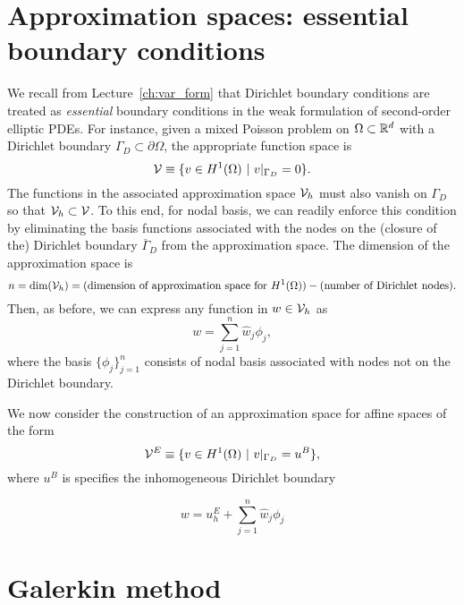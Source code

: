 \section{Approximation spaces: essential boundary conditions}
We recall from Lecture~\ref{ch:var_form} that Dirichlet boundary conditions are treated as \emph{essential} boundary conditions in the weak formulation of second-order elliptic PDEs.  For instance, given a mixed Poisson problem on $\Omega \subset \mathbb{R}^d$ with a Dirichlet boundary $\Gamma_D \subset \partial \Omega$, the appropriate function space is
\begin{equation*}
  \mathcal{V} \equiv \{ v \in H^1(\Omega) \ | \ v|_{\Gamma_D} = 0 \}.
\end{equation*}
The functions in the associated approximation space $\mathcal{V}_h$ must also vanish on $\Gamma_D$ so that $\mathcal{V}_h \subset \mathcal{V}$.  To this end, for nodal basis, we can readily enforce this condition by eliminating the basis functions associated with the nodes on the (closure of the) Dirichlet boundary $\overline \Gamma_D$ from the approximation space. The dimension of the approximation space is
\begin{equation*}
  n = \text{dim}(\mathcal{V}_h) = (\text{dimension of approximation space for $H^1(\Omega)$}) - (\text{number of Dirichlet nodes}).
\end{equation*}
Then, as before, we can express any function in $w \in \mathcal{V}_h$ as
\begin{equation*}
  w = \sum_{j=1}^n \hat w_j \phi_j,
\end{equation*}
where the basis $\{ \phi_j \}_{j=1}^n$ consists of nodal basis associated with nodes not on the Dirichlet boundary.

We now consider the construction of an approximation space for affine spaces of the form
\begin{equation*}
  \mathcal{V}^E \equiv \{ v \in H^1(\Omega) \ | \ v|_{\Gamma_D} = u^B \},
\end{equation*}
where $u^B$ is specifies the inhomogeneous Dirichlet boundary 

\begin{equation*}
  w = u^E_h + \sum_{j=1}^n \hat w_j \phi_j
\end{equation*}
  


\section{Galerkin method}

